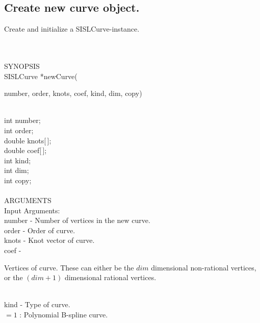 \subsection{Create new curve object.}
\begin{minipg1}
Create and initialize a SISLCurve-instance.
\end{minipg1} \\ \\
SYNOPSIS\\
        \>SISLCurve *newCurve(\begin{minipg3}
        {\fov number}, {\fov order}, {\fov knots}, {\fov coef}, {\fov kind}, {\fov dim}, {\fov copy})
                \end{minipg3}\\[0.3ex]
                \>\>    int    \>       {\fov number};\\
                \>\>    int    \>       {\fov order};\\
                \>\>    double \>       {\fov knots}[\,];\\
                \>\>    double \>       {\fov coef}[\,];\\
                \>\>    int    \>       {\fov kind};\\
                \>\>    int    \>       {\fov dim};\\
                \>\>    int    \>       {\fov copy};\\
\\
ARGUMENTS\\
        \>Input Arguments:\\
        \>\>    {\fov number}   \> - \> Number of vertices in the new curve.\\
        \>\>    {\fov order} \> - \> Order of curve.\\
        \>\>    {\fov knots} \> - \> Knot vector of curve.\\
        \>\>    {\fov coef}  \> - \> \begin{minipg2}
                      Vertices of curve. These can either be the $dim$
                      \mbox{dimensional}
                      non-rational vertices, or the $(dim+1)$ dimensional rational
                      vertices.
                                     \end{minipg2}\\[0.8ex]
        \>\>    {\fov kind} \> - \> Type of curve.\\
        \>\>\>\>\>       $= 1$ :\> Polynomial B-spline curve.\\
